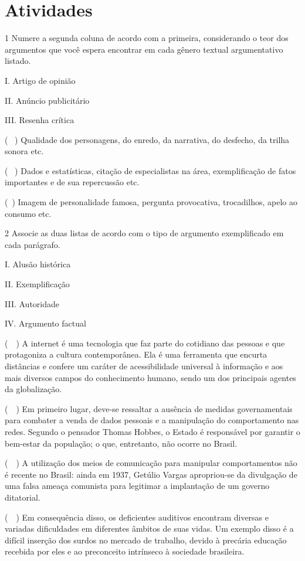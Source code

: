 \section*{Atividades}

\num{1} Numere a segunda coluna de acordo com a primeira, considerando o
teor dos argumentos que você espera encontrar em cada gênero textual
argumentativo listado.

\begin{multicols}{2}
I. Artigo de opinião


II. Anúncio publicitário


III. Resenha crítica 
\columnbreak

(~ ) Qualidade dos personagens, do
enredo, da narrativa, do desfecho, da trilha sonora etc. 

(~ ) Dados e estatísticas, citação de
especialistas na área, exemplificação de fatos importantes e de sua
repercussão etc.

(~) Imagem de
personalidade famosa, pergunta provocativa, trocadilhos, apelo ao
consumo etc.
\end{multicols}

\num{2} Associe as duas listas de acordo com o tipo de argumento
exemplificado em cada parágrafo.

\begin{multicols}{2}
I. Alusão histórica 

II. Exemplificação

III. Autoridade

IV. Argumento factual
\columnbreak

(~~) A internet é uma tecnologia que faz
parte do cotidiano das pessoas e que protagoniza a cultura
contemporânea. Ela é uma ferramenta que encurta distâncias e confere um
caráter de acessibilidade universal à informação e aos mais diversos
campos do conhecimento humano, sendo um dos principais agentes da globalização.

(~~) Em primeiro lugar,
deve-se ressaltar a ausência de medidas governamentais para combater a
venda de dados pessoais e a manipulação do comportamento nas redes.
Segundo o pensador Thomas Hobbes, o Estado é responsável por garantir o
bem-estar da população; o que, entretanto, não ocorre no Brasil.

(~~) A utilização dos meios de comunicação para
manipular comportamentos não é recente no Brasil: ainda em 1937, Getúlio
Vargas apropriou-se da divulgação de uma falsa ameaça comunista para
legitimar a implantação de um governo ditatorial. 

(~~) Em consequência disso, os deficientes auditivos
encontram diversas e variadas dificuldades em diferentes âmbitos de suas vidas. Um
exemplo disso é a difícil inserção dos surdos no mercado de trabalho,
devido à precária educação recebida por eles e ao preconceito intrínseco à sociedade brasileira.
\end{multicols}

